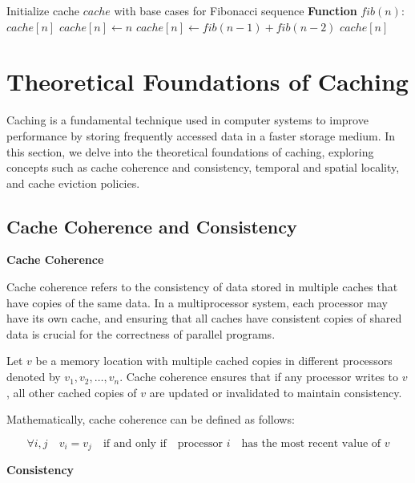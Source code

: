 \documentclass[12pt]{book} %
\begin{document}
\FloatBarrier
\begin{algorithm}
\caption{Example of Caching with Fibonacci Sequence}
\begin{algorithmic}[1]
\State Initialize cache $cache$ with base cases for Fibonacci sequence
\State \textbf{Function} $fib(n)$:
        \Return $cache[n]$
    \EndIf
        \State $cache[n] \leftarrow n$
    \Else
        \State $cache[n] \leftarrow fib(n-1) + fib(n-2)$
    \EndIf
    \Return $cache[n]$
\end{algorithmic}
\end{algorithm}
\FloatBarrier

\section{Theoretical Foundations of Caching}

Caching is a fundamental technique used in computer systems to improve performance by storing frequently accessed data in a faster storage medium. In this section, we delve into the theoretical foundations of caching, exploring concepts such as cache coherence and consistency, temporal and spatial locality, and cache eviction policies.

\subsection{Cache Coherence and Consistency}

\textbf{Cache Coherence}

Cache coherence refers to the consistency of data stored in multiple caches that have copies of the same data. In a multiprocessor system, each processor may have its own cache, and ensuring that all caches have consistent copies of shared data is crucial for the correctness of parallel programs.

Let \(v\) be a memory location with multiple cached copies in different processors denoted by \(v_1, v_2, \ldots, v_n\). Cache coherence ensures that if any processor writes to \(v\), all other cached copies of \(v\) are updated or invalidated to maintain consistency.

Mathematically, cache coherence can be defined as follows:

\[
\forall i, j \quad v_i = v_j \quad \text{if and only if} \quad \text{processor } i \quad \text{has the most recent value of } v
\]

\textbf{Consistency}
\end{document}
